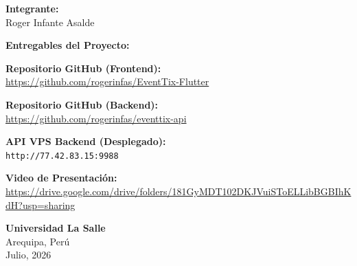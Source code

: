 \begin{titlepage}
\begin{minipage}{0.85\textwidth}
        \textbf{Integrante:} \\
        Roger Infante Asalde \\
        \vspace{0.6cm}
        
        \textbf{Entregables del Proyecto:} \\
        \vspace{0.3cm}
        
        \textbf{Repositorio GitHub (Frontend):} \\
        \url{https://github.com/rogerinfas/EventTix-Flutter} \\
        \vspace{0.2cm}
        
        \textbf{Repositorio GitHub (Backend):} \\
        \url{https://github.com/rogerinfas/eventtix-api} \\
        \vspace{0.2cm}
        
        \textbf{API VPS Backend (Desplegado):} \\
        \texttt{http://77.42.83.15:9988} \\
        \vspace{0.2cm}
        
        \textbf{Video de Presentación:} \\
        \url{https://drive.google.com/drive/folders/181GyMDT102DKJVuiSToELLibBGBIhKdH?usp=sharing} \\
    \end{minipage}
    
    \vfill
    
    {\large \textbf{Universidad La Salle}} \\
    {\small Arequipa, Perú} \\
    \vspace{0.1cm}
    {\small Julio, 2026}
    
\end{titlepage}
